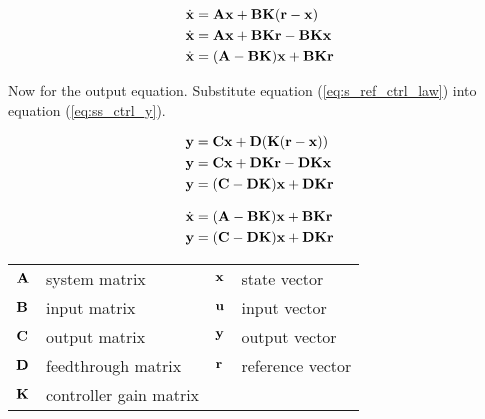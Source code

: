 \begin{align}
  \dot{\mathbf{x}} &= \mathbf{A}\mathbf{x} + \mathbf{B}\mathbf{K}(\mathbf{r} - \mathbf{x}) \nonumber
    \\
  \dot{\mathbf{x}} &= \mathbf{A}\mathbf{x} + \mathbf{B}\mathbf{K}\mathbf{r} -
    \mathbf{B}\mathbf{K}\mathbf{x} \nonumber \\
  \dot{\mathbf{x}} &= (\mathbf{A} - \mathbf{B}\mathbf{K})\mathbf{x} + \mathbf{B}\mathbf{K}\mathbf{r}
\end{align}

Now for the output equation. Substitute equation (\ref{eq:s_ref_ctrl_law}) into
equation (\ref{eq:ss_ctrl_y}).

\begin{align}
  \mathbf{y} &= \mathbf{C}\mathbf{x} + \mathbf{D}(\mathbf{K}(\mathbf{r} - \mathbf{x})) \nonumber \\
  \mathbf{y} &= \mathbf{C}\mathbf{x} + \mathbf{D}\mathbf{K}\mathbf{r} - \mathbf{D}\mathbf{K}\mathbf{x}
    \nonumber \\
  \mathbf{y} &= (\mathbf{C} - \mathbf{D}\mathbf{K})\mathbf{x} + \mathbf{D}\mathbf{K}\mathbf{r}
\end{align}

\begin{theorem}
  \begin{align}
    \dot{\mathbf{x}} &= (\mathbf{A} - \mathbf{B}\mathbf{K})\mathbf{x} + \mathbf{B}\mathbf{K}\mathbf{r}
      \label{eq:s_ref_ctrl_x} \\
    \mathbf{y} &= (\mathbf{C} - \mathbf{D}\mathbf{K})\mathbf{x} + \mathbf{D}\mathbf{K}\mathbf{r}
      \label{eq:s_ref_ctrl_y}
  \end{align}

  \begin{center}
    \renewcommand{\arraystretch}{1.3}
    \begin{tabulary}{\linewidth}{LLLL}
      $\mathbf{A}$ & system matrix      & $\mathbf{x}$ & state vector \\
      $\mathbf{B}$ & input matrix       & $\mathbf{u}$ & input vector \\
      $\mathbf{C}$ & output matrix      & $\mathbf{y}$ & output vector \\
      $\mathbf{D}$ & feedthrough matrix & $\mathbf{r}$ & \gls{reference} vector \\
      $\mathbf{K}$ & controller gain matrix &  &  \\
    \end{tabulary}
  \end{center}
\end{theorem}

